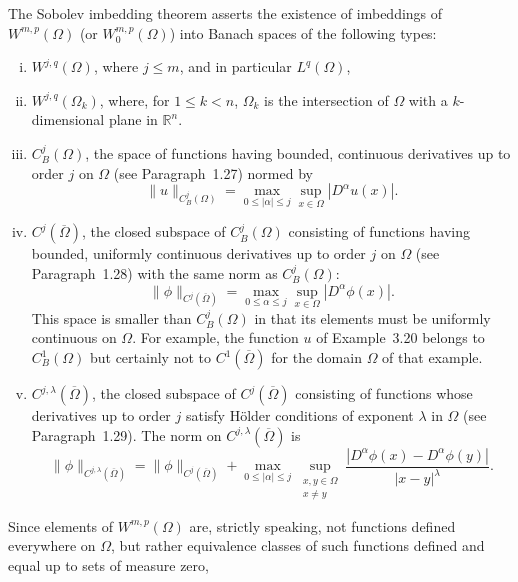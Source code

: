 \begin{para}
  The Sobolev imbedding theorem asserts the existence of imbeddings of $W^{m,p}(\Omega)$
  (or $W_0^{m, p}(\Omega)$) into Banach spaces of the following types:
  \begin{enumerate}[(i)]
    \item $W^{j,q}(\Omega)$, where $j \leq m$, and in particular $L^q(\Omega)$,
    \item $W^{j,q}\left(\Omega_k\right)$, where, for $1 \leq k<n$,
      $\Omega_k$ is the intersection of $\Omega$ with a
      $k$-dimensional plane in $\mathbb{R}^n$.
    \item $C_B^j(\Omega)$, the space of functions having bounded,
      continuous derivatives up to order $j$ on $\Omega$ (see Paragraph~1.27) normed by
      \[
        \|u\|_{C_B^j(\Omega)} = \max_{0 \leq|\alpha| \leq j} \sup_{x \in \Omega}\left|D^\alpha u(x)\right|.
      \]
    \item $C^j(\overline{\Omega})$, the closed subspace of $C_B^j(\Omega)$ consisting of functions
      having bounded, uniformly continuous derivatives up to order $j$ on $\Omega$
      (see Paragraph~1.28) with the same norm as $C_B^j(\Omega)$:
      \[
        \|\phi\|_{C^j(\overline{\Omega})} 
          = \max_{0 \leq \alpha \leq j} \sup_{x \in \Omega} \left|D^\alpha \phi(x)\right|.
      \]
      This space is smaller than $C_B^j(\Omega)$ in that its elements must be uniformly continuous 
      on $\Omega$. For example, the function $u$ of Example~3.20 belongs to $C_B^1(\Omega)$ but 
      certainly not to $C^1(\overline{\Omega})$ for the domain $\Omega$ of that example.
    \item $C^{j, \lambda}(\overline{\Omega})$, the closed subspace of $C^j(\overline{\Omega})$ consisting of 
      functions whose derivatives up to order $j$ satisfy Hölder conditions of exponent $\lambda$ 
      in $\Omega$ (see Paragraph~1.29). The norm on $C^{j, \lambda}(\overline{\Omega})$ is
      \[
        \|\phi\|_{C^{j, \lambda}(\overline{\Omega})}
          = \|\phi\|_{C^j(\overline{\Omega})}
            + \max_{0 \leq|\alpha| \leq j} \sup_{\substack{x, y \in \Omega \\ x \neq y}}
              \frac{\left|D^\alpha \phi(x)-D^\alpha \phi(y)\right|}{|x-y|^\lambda} .
      \]
  \end{enumerate}
  Since elements of $W^{m,p}(\Omega)$ are, strictly speaking,
  not functions defined everywhere on $\Omega$, but rather equivalence classes of such functions defined and equal up to sets of measure zero,

\end{para}
